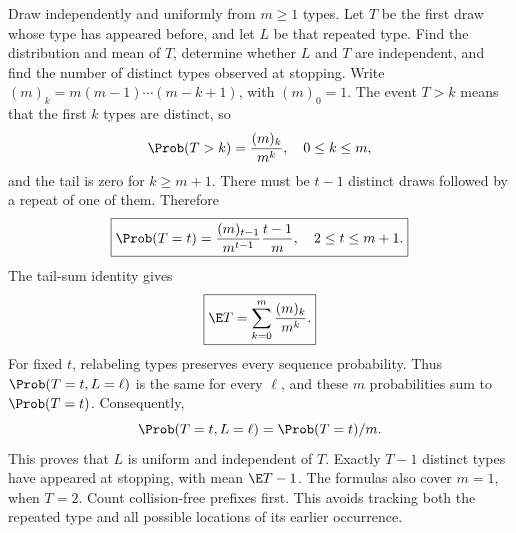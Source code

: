 Draw independently and uniformly from $m\ge1$ types. Let $T$ be the first draw whose type has appeared before, and let $L$ be that repeated type. Find the distribution and mean of $T$, determine whether $L$ and $T$ are independent, and find the number of distinct types observed at stopping.
\solution Write $(m)_k=m(m-1)\cdots(m-k+1)$, with $(m)_0=1$. The event $T>k$ means that the first $k$ types are distinct, so
\[
\Prob(T>k)=\frac{(m)_k}{m^k},\quad0\le k\le m,
\]
and the tail is zero for $k\ge m+1$. There must be $t-1$ distinct draws followed by a repeat of one of them. Therefore
\[
\boxed{\Prob(T=t)=\frac{(m)_{t-1}}{m^{t-1}}\frac{t-1}{m},
\quad2\le t\le m+1.}
\]
The tail-sum identity gives
\[
\boxed{\E T=\sum_{k=0}^m\frac{(m)_k}{m^k}.}
\]
For fixed $t$, relabeling types preserves every sequence probability. Thus $\Prob(T=t,L=\ell)$ is the same for every $\ell$, and these $m$ probabilities sum to $\Prob(T=t)$. Consequently,
\[
\Prob(T=t,L=\ell)=\Prob(T=t)/m.
\]
This proves that $L$ is uniform and independent of $T$. Exactly $T-1$ distinct types have appeared at stopping, with mean $\E T-1$. The formulas also cover $m=1$, when $T=2$.
\insight Count collision-free prefixes first. This avoids tracking both the repeated type and all possible locations of its earlier occurrence.
